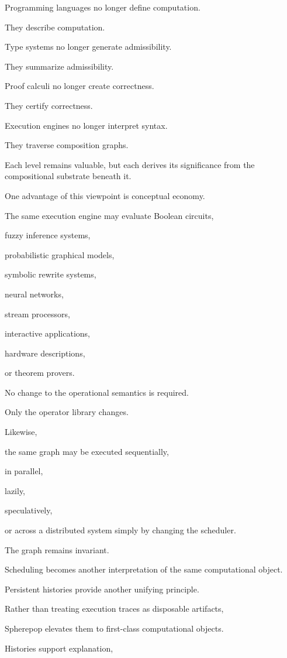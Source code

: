 \documentclass[12pt,oneside]{article}
\begin{document}
Programming languages no longer define computation.

They describe computation.

Type systems no longer generate admissibility.

They summarize admissibility.

Proof calculi no longer create correctness.

They certify correctness.

Execution engines no longer interpret syntax.

They traverse composition graphs.

Each level remains valuable, but each derives its significance from the compositional substrate beneath it.

One advantage of this viewpoint is conceptual economy.

The same execution engine may evaluate Boolean circuits,

fuzzy inference systems,

probabilistic graphical models,

symbolic rewrite systems,

neural networks,

stream processors,

interactive applications,

hardware descriptions,

or theorem provers.

No change to the operational semantics is required.

Only the operator library changes.

Likewise,

the same graph may be executed sequentially,

in parallel,

lazily,

speculatively,

or across a distributed system simply by changing the scheduler.

The graph remains invariant.

Scheduling becomes another interpretation of the same computational object.

Persistent histories provide another unifying principle.

Rather than treating execution traces as disposable artifacts,

Spherepop elevates them to first-class computational objects.

Histories support explanation,
\end{document}
